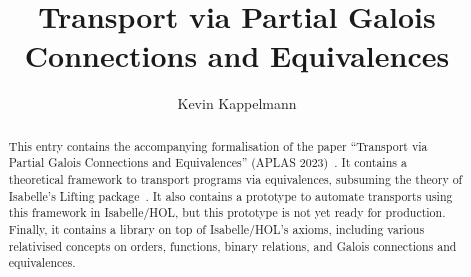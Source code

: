 \documentclass[11pt,a4paper]{report}
\begin{document}
\title{Transport via Partial Galois Connections and Equivalences}
\author{Kevin Kappelmann}
\maketitle

\begin{abstract}
This entry contains the accompanying formalisation of the paper
``Transport via Partial Galois Connections and Equivalences'' (APLAS 2023)~\cite{transport}.
It contains a theoretical framework to transport programs via equivalences,
subsuming the theory of Isabelle's Lifting package~\cite{lifting}.
It also contains a prototype to automate transports using this framework in Isabelle/HOL,\@
but this prototype is not yet ready for production.
Finally, it contains a library on top of Isabelle/HOL's axioms,
including various relativised concepts on orders, functions, binary relations,
and Galois connections and equivalences.
\end{abstract}

\tableofcontents





\end{document}
